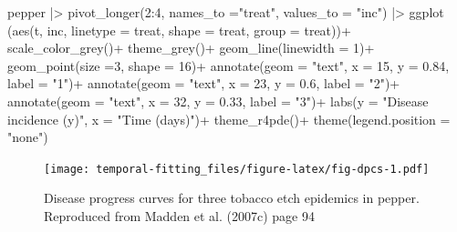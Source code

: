 \documentclass[
  letterpaper,
]{book}
\newenvironment{Shaded}{\begin{snugshade}}{\end{snugshade}}
\newcommand{\AttributeTok}[1]{\textcolor[rgb]{0.40,0.45,0.13}{#1}}
\newcommand{\DecValTok}[1]{\textcolor[rgb]{0.68,0.00,0.00}{#1}}
\newcommand{\FloatTok}[1]{\textcolor[rgb]{0.68,0.00,0.00}{#1}}
\newcommand{\FunctionTok}[1]{\textcolor[rgb]{0.28,0.35,0.67}{#1}}
\newcommand{\NormalTok}[1]{\textcolor[rgb]{0.00,0.23,0.31}{#1}}
\newcommand{\SpecialCharTok}[1]{\textcolor[rgb]{0.37,0.37,0.37}{#1}}
\newcommand{\StringTok}[1]{\textcolor[rgb]{0.13,0.47,0.30}{#1}}
\begin{document}
\begin{Shaded}
\begin{Highlighting}[]
\NormalTok{pepper }\SpecialCharTok{|\textgreater{}} 
  \FunctionTok{pivot\_longer}\NormalTok{(}\DecValTok{2}\SpecialCharTok{:}\DecValTok{4}\NormalTok{, }\AttributeTok{names\_to =}\StringTok{"treat"}\NormalTok{, }\AttributeTok{values\_to =} \StringTok{"inc"}\NormalTok{) }\SpecialCharTok{|\textgreater{}} 
  \FunctionTok{ggplot}\NormalTok{ (}\FunctionTok{aes}\NormalTok{(t, inc, }
              \AttributeTok{linetype =}\NormalTok{ treat, }
              \AttributeTok{shape =}\NormalTok{ treat, }
              \AttributeTok{group =}\NormalTok{ treat))}\SpecialCharTok{+}
  \FunctionTok{scale\_color\_grey}\NormalTok{()}\SpecialCharTok{+}
  \FunctionTok{theme\_grey}\NormalTok{()}\SpecialCharTok{+}
  \FunctionTok{geom\_line}\NormalTok{(}\AttributeTok{linewidth =} \DecValTok{1}\NormalTok{)}\SpecialCharTok{+}
  \FunctionTok{geom\_point}\NormalTok{(}\AttributeTok{size =}\DecValTok{3}\NormalTok{, }\AttributeTok{shape =} \DecValTok{16}\NormalTok{)}\SpecialCharTok{+}
  \FunctionTok{annotate}\NormalTok{(}\AttributeTok{geom =} \StringTok{"text"}\NormalTok{, }\AttributeTok{x =} \DecValTok{15}\NormalTok{, }\AttributeTok{y =} \FloatTok{0.84}\NormalTok{, }\AttributeTok{label =} \StringTok{"1"}\NormalTok{)}\SpecialCharTok{+}
  \FunctionTok{annotate}\NormalTok{(}\AttributeTok{geom =} \StringTok{"text"}\NormalTok{, }\AttributeTok{x =} \DecValTok{23}\NormalTok{, }\AttributeTok{y =} \FloatTok{0.6}\NormalTok{, }\AttributeTok{label =} \StringTok{"2"}\NormalTok{)}\SpecialCharTok{+}
  \FunctionTok{annotate}\NormalTok{(}\AttributeTok{geom =} \StringTok{"text"}\NormalTok{, }\AttributeTok{x =} \DecValTok{32}\NormalTok{, }\AttributeTok{y =} \FloatTok{0.33}\NormalTok{, }\AttributeTok{label =} \StringTok{"3"}\NormalTok{)}\SpecialCharTok{+}
  \FunctionTok{labs}\NormalTok{(}\AttributeTok{y =} \StringTok{"Disease incidence (y)"}\NormalTok{,}
       \AttributeTok{x =} \StringTok{"Time (days)"}\NormalTok{)}\SpecialCharTok{+}
  \FunctionTok{theme\_r4pde}\NormalTok{()}\SpecialCharTok{+}
  \FunctionTok{theme}\NormalTok{(}\AttributeTok{legend.position =} \StringTok{"none"}\NormalTok{)}
\end{Highlighting}
\end{Shaded}

\begin{figure}

\texttt{[image: temporal-fitting\_files/figure-latex/fig-dpcs-1.pdf]} \hfill{}

\caption{\label{fig-dpcs}Disease progress curves for three tobacco etch
epidemics in pepper. Reproduced from Madden et al. (2007c) page 94}

\end{figure}
\end{document}
